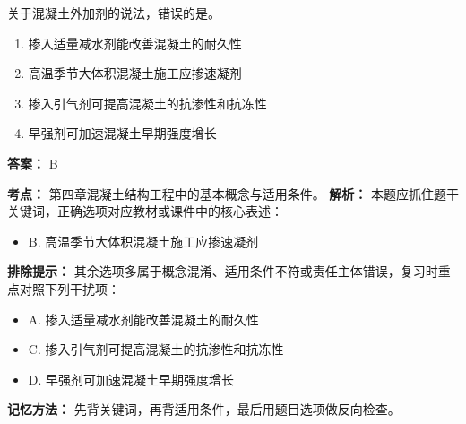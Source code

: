 \documentclass[UTF8,fontset=fandol,11pt]{ctexart}
\begin{document}
\vspace{0.2em}

\begin{quizbox}[title={第 68 题}]
关于混凝土外加剂的说法，错误的是。\\
\begin{enumerate}[label=\Alph*.]
\item 掺入适量减水剂能改善混凝土的耐久性
\item 高温季节大体积混凝土施工应掺速凝剂
\item 掺入引气剂可提高混凝土的抗渗性和抗冻性
\item 早强剂可加速混凝土早期强度增长
\end{enumerate}
\textbf{答案：} B
\vspace{0.25em}
\begin{answerbox}[title={考点解析}]
\textbf{考点：} 第四章混凝土结构工程中的基本概念与适用条件。
\textbf{解析：} 本题应抓住题干关键词，正确选项对应教材或课件中的核心表述：
\begin{itemize}
\item B. 高温季节大体积混凝土施工应掺速凝剂
\end{itemize}
\textbf{排除提示：} 其余选项多属于概念混淆、适用条件不符或责任主体错误，复习时重点对照下列干扰项：
\begin{itemize}
\item A. 掺入适量减水剂能改善混凝土的耐久性
\item C. 掺入引气剂可提高混凝土的抗渗性和抗冻性
\item D. 早强剂可加速混凝土早期强度增长
\end{itemize}
\textbf{记忆方法：} 先背关键词，再背适用条件，最后用题目选项做反向检查。
\end{answerbox}
\end{quizbox}

\vspace{0.2em}
\end{document}

